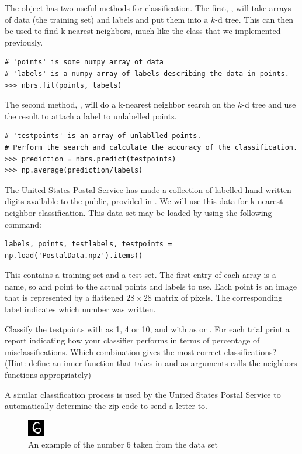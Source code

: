 The  object has two useful methods for classification.
The first, , will take arrays of data (the training set) and labels and put them into a $k$-d tree.
This can then be used to find k-nearest neighbors, much like the  class that we implemented previously.

\begin{lstlisting}
# 'points' is some numpy array of data
# 'labels' is a numpy array of labels describing the data in points.
>>> nbrs.fit(points, labels)
\end{lstlisting}

The second method, , will do a k-nearest neighbor search on the $k$-d tree and use the result to attach a label to unlabelled points.

\begin{lstlisting}
# 'testpoints' is an array of unlablled points.
# Perform the search and calculate the accuracy of the classification.
>>> prediction = nbrs.predict(testpoints)
>>> np.average(prediction/labels)
\end{lstlisting}

\begin{problem}
The United States Postal Service has made a collection of labelled hand written digits available to the public, provided in .
We will use this data for k-nearest neighbor classification.
This data set may be loaded by using the following command:
\begin{lstlisting}
labels, points, testlabels, testpoints = np.load('PostalData.npz').items()
\end{lstlisting}
This contains a training set and a test set.
The first entry of each array is a name, so  and  point to the actual points and labels to use.
Each point is an image that is represented by a flattened $28 \times 28$ matrix of pixels. 
The corresponding label indicates which number was written.

Classify the testpoints with  as 1, 4 or 10, and with  as  or .
For each trial print a report indicating how your classifier performs in terms of percentage of misclassifications.
Which combination gives the most correct classifications?
(Hint: define an inner function that takes in  and  as arguments calls the neighbors functions appropriately)

A similar classification process is used by the United States Postal Service to automatically determine the zip code to send a letter to.

\begin{figure}[H]
\includegraphics[width=.25\textwidth]{Example.png}
\caption{An example of the number 6 taken from the data set}
\end{figure}
\end{problem}
